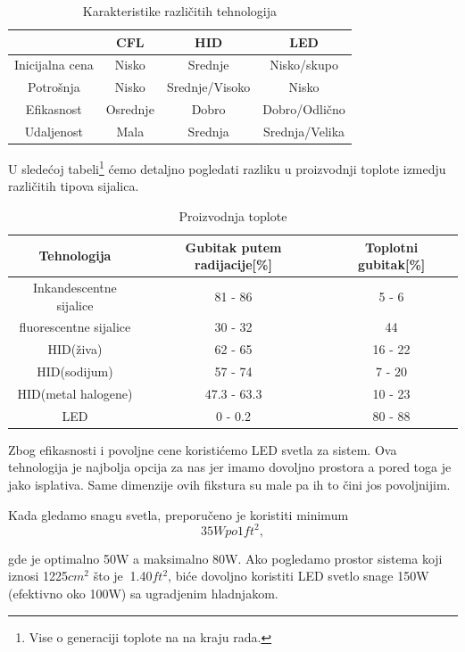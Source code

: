 \documentclass[a4paper,11pt]{book}
\begin{document}
\begin{table}[ht]
  \caption{Karakteristike različitih tehnologija}
  \centering
  \begin{tabular}{|c|c|c|c|}
  \hline
   & CFL & HID & LED \\ \hline
  Inicijalna cena & Nisko & Srednje & Nisko/skupo \\ \hline
  Potrošnja & Nisko & Srednje/Visoko & Nisko \\ \hline
  Efikasnost & Osrednje & Dobro & Dobro/Odlično \\ \hline
  Udaljenost & Mala & Srednja & Srednja/Velika \\ \hline
  \end{tabular}
\end{table}

U sledećoj tabeli\footnote{Vise o generaciji toplote na na kraju rada.} ćemo detaljno pogledati razliku u proizvodnji toplote izmedju različitih tipova sijalica.


\begin{table}[ht]
  \caption{Proizvodnja toplote}
  \centering
  \begin{tabular}{|c|c|c|}
  \hline
    Tehnologija & Gubitak putem radijacije[\%] & Toplotni gubitak[\%] \\ \hline
  Inkandescentne sijalice & 81 - 86 & 5 - 6 \\ \hline
  fluorescentne sijalice & 30 - 32 & 44 \\ \hline
  HID(živa) & 62 - 65 & 16 - 22 \\ \hline
  HID(sodijum) & 57 - 74 & 7 - 20 \\ \hline
  HID(metal halogene) & 47.3 - 63.3 & 10 - 23 \\ \hline
  LED & 0 - 0.2 & 80 - 88 \\ \hline
  \end{tabular}
\end{table}

Zbog efikasnosti i povoljne cene koristićemo LED svetla za sistem. Ova tehnologija je najbolja opcija za nas jer imamo dovoljno prostora a pored toga je jako isplativa. Same dimenzije ovih fikstura su male pa ih to čini jos povoljnijim.


Kada gledamo snagu svetla, preporučeno je koristiti minimum 
\[35W po 1ft^2,\]

gde je optimalno 50W a maksimalno 80W. Ako pogledamo prostor sistema koji iznosi 1225$cm^2$ što je $~$1.40$ft^2$, biće dovoljno koristiti LED svetlo snage 150W (efektivno oko 100W) sa ugradjenim hladnjakom.\\
\end{document}
